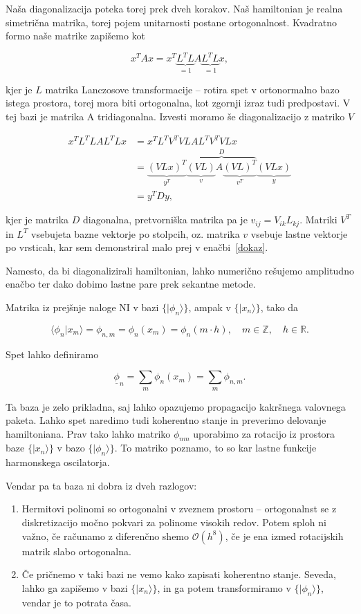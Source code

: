 \documentclass[a4 paper, 12pt]{article}
\begin{document}
Naša diagonalizacija poteka torej prek dveh korakov. Naš hamiltonian je realna simetrična matrika, torej pojem
unitarnosti postane ortogonalnost. Kvadratno formo naše matrike zapišemo kot

\[
	x^TAx = x^T \underbrace{L^T L}_{= 1} A \underbrace{L^T L}_{= 1} x,
\]

kjer je $L$ matrika Lanczosove transformacije -- rotira spet v ortonormalno bazo istega prostora, torej mora biti ortogonalna, kot zgornji
izraz tudi predpostavi. V tej bazi je matrika A tridiagonalna. Izvesti moramo še diagonalizacijo z matriko $V$

\begin{align*}
	x^T L^T L A L^T L x &= x^T L^T V^T V L A L^T V^T V L x \\
		&= \underbrace{(VLx)^T}_{y^T} \overbrace{\underbrace{(VL)}_{v} A \underbrace{(VL)^T}_{v^T}}^{D} \underbrace{(VLx)}_{y} \\
		&= y^T D y,
\end{align*}

kjer je matrika $D$ diagonalna, pretvorniška matrika pa je $v_{ij} = V_{ik}L_{kj}$. Matriki $V^T$ in $L^T$ vsebujeta bazne
vektorje po stolpcih, oz. matrika $v$ vsebuje lastne vektorje po vrsticah, kar sem demonstriral malo prej v
enačbi~\eqref{dokaz}.

Namesto, da bi diagonalizirali hamiltonian, lahko numerično rešujemo amplitudno enačbo ter dako dobimo lastne pare prek
sekantne metode.

Matrika iz prejšnje naloge NI v bazi $\big\{|\phi_n\rangle\big\}$, ampak v $\big\{|x_n\rangle\big\}$, tako da

\[
	\langle \phi_n | x_m \rangle = \phi_{n,m} = \phi_n (x_m) = \phi_n (m \cdot h), \quad m \in \mathbb{Z}, \quad h \in \mathbb{R}.
\]

Spet lahko definiramo

\[
	\underline{\phi}_n = \sum_m \phi_n(x_m) = \sum_m \phi_{n,m}.
\]

Ta baza je zelo prikladna, saj lahko opazujemo propagacijo kakršnega valovnega paketa. Lahko spet naredimo tudi koherentno stanje
in preverimo delovanje hamiltoniana. Prav tako lahko matriko $\phi_{nm}$ uporabimo za rotacijo iz prostora baze 
$\big\{|x_n\rangle\big\}$ v bazo $\big\{|\phi_n\rangle\big\}$. To matriko poznamo, to so kar lastne funkcije harmonskega
oscilatorja.

Vendar pa ta baza ni dobra iz dveh razlogov:
\begin{enumerate}
	\item{Hermitovi polinomi so ortogonalni v zveznem prostoru -- ortogonalnst se z diskretizacijo močno pokvari za polinome
		visokih redov. Potem sploh ni
		važno, če računamo z diferenčno shemo $\mathcal{O}(h^8)$, če je ena izmed rotacijskih matrik slabo ortogonalna.}
	\item{Če pričnemo v taki bazi ne vemo kako zapisati koherentno stanje. Seveda, lahko ga zapišemo v bazi $\big\{|x_n\rangle\big\}$,
		in ga potem transformiramo v $\big\{|\phi_n\rangle\big\}$, vendar je to potrata časa.}
\end{enumerate}
\end{document}
